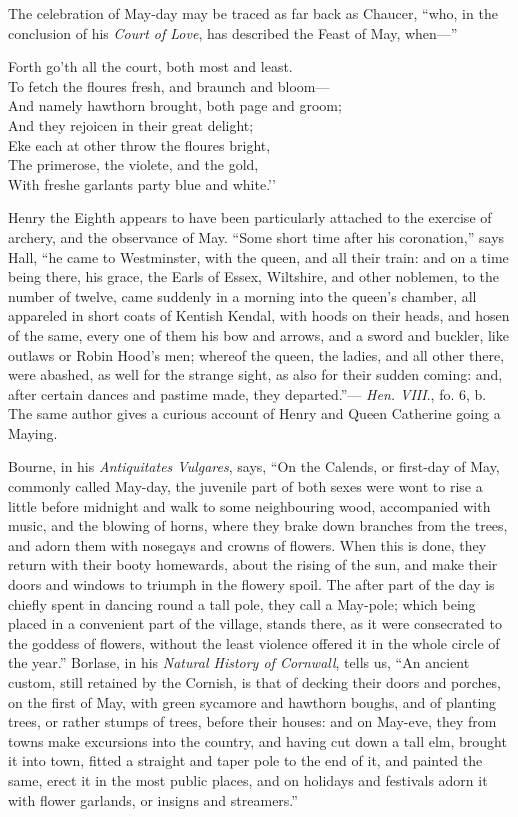 The celebration of May-day may be traced as far back as Chaucer, “who, in
the conclusion of his \textit{Court of Love}, has described the Feast of May, when—”

\begin{scverse}
Forth go’th all the court, both most and least.\\
To fetch the floures fresh, and braunch and bloom—\\
And namely hawthorn brought, both page and groom;\\
And they rejoicen in their great delight;\\
Eke each at other throw the floures bright,\\
The primerose, the violete, and the gold,\\
With freshe garlants party blue and white.’’
\end{scverse}

Henry the Eighth appears to have been particularly attached to the exercise of
archery, and the observance of May. “Some short time after his coronation,”
says Hall, “he came to Westminster, with the queen, and all their train: and on
a time being there, his grace, the Earls of Essex, Wiltshire, and other noblemen,
to the number of twelve, came suddenly in a morning into the queen’s chamber,
all appareled in short coats of Kentish Kendal, with hoods on their heads, and
hosen of the same, every one of them his bow and arrows, and a sword and
buckler, like outlaws or Robin Hood’s men; whereof the queen, the ladies, and
all other there, were abashed, as well for the strange sight, as also for their
sudden coming: and, after certain dances and pastime made, they departed.”—
\textit{Hen. VIII}., fo. 6, b. The same author gives a curious account of Henry and
Queen Catherine going a Maying.

Bourne, in his \textit{Antiquitates Vulgares}, says, “On the Calends, or first-day of
May, commonly called May-day, the juvenile part of both sexes were wont to rise
a little before midnight and walk to some neighbouring wood, accompanied with
music, and the blowing of horns, where they brake down branches from the trees,
and adorn them with nosegays and crowns of flowers. When this is done, they
return with their booty homewards, about the rising of the sun, and make their
doors and windows to triumph in the flowery spoil. The after part of the day is
chiefly spent in dancing round a tall pole, they call a May-pole; which being
placed in a convenient part of the village, stands there, as it were consecrated
to the goddess of flowers, without the least violence offered it in the whole circle
of the year.” Borlase, in his \textit{Natural History of Cornwall}, tells us, “An ancient
custom, still retained by the Cornish, is that of decking their doors and porches,
on the first of May, with green sycamore and hawthorn boughs, and of planting
trees, or rather stumps of trees, before \pagebreak their houses: and on May-eve, they from
towns make excursions into the country, and having cut down a tall elm, brought
it into town, fitted a straight and taper pole to the end of it, and painted the
same, erect it in the most public places, and on holidays and festivals adorn it
with flower garlands, or insigns and streamers.”

